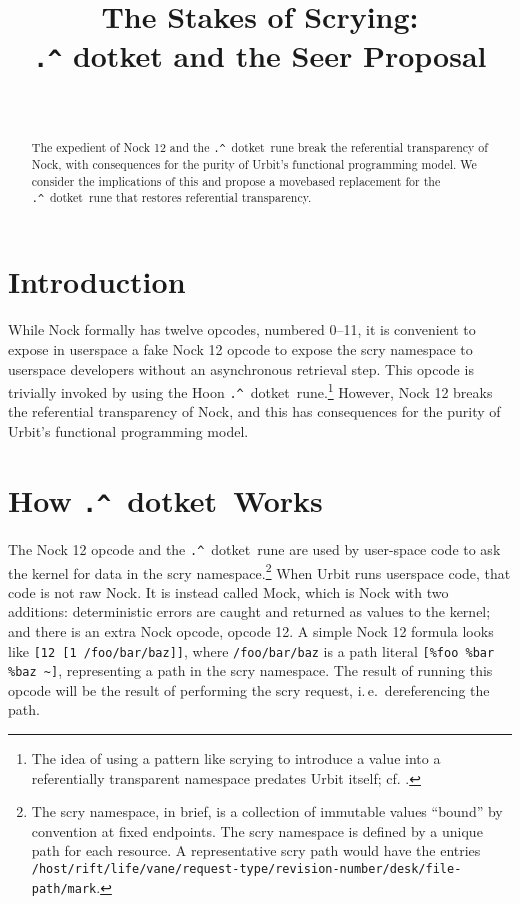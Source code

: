 \documentclass[twoside]{article}
\title{The Stakes of Scrying:  \\ \lstinline[style=inlinecode]{.^} dotket and the Seer Proposal}
\author{\authorname~\authorpatp \\ \affiliation}
\date{}
\newcommand{\dotket}{\lstinline[style=inlinecode]{.^}~dotket}
\begin{document}
\maketitle
\thispagestyle{firststyle}

\begin{abstract}
\noindent
The expedient of Nock 12 and the \dotket~rune break the referential transparency of Nock, with consequences for the purity of Urbit's functional programming model.  We consider the implications of this and propose a move\-based replacement for the \dotket~rune that restores referential transparency.
\end{abstract}

\setcounter{page}{47}

\tableofcontents

\section{Introduction}

While Nock formally has twelve opcodes, numbered 0--11, it is convenient to expose in userspace a fake Nock 12 opcode to expose the scry namespace to userspace developers without an asynchronous retrieval step.  This opcode is trivially invoked by using the Hoon \dotket~rune.\footnote{The idea of using a pattern like scrying to introduce a value into a referentially transparent namespace predates Urbit itself; cf. \citet{Yarvin2006}.}  However, Nock 12 breaks the referential transparency of Nock, and this has consequences for the purity of Urbit's functional programming model.

\section{How \dotket~Works}

The Nock 12 opcode and the \dotket~rune are used by user-\newline{}space code to ask the kernel for data in the scry namespace.\footnote{The scry namespace, in brief, is a collection of immutable values “bound” by convention at fixed endpoints.  The scry namespace is defined by a unique path for each resource.  A representative scry path would have the entries \texttt{/host/rift/life/vane/request-type/revision-number/desk\newline{}/file-path/mark}.}  When Urbit runs userspace code, that code is not raw Nock.  It is instead called Mock, which is Nock with two additions:   deterministic errors are caught and returned as values to the kernel; and there is an extra Nock opcode, opcode 12.  A simple Nock 12 formula looks like \lstinline[style=inlinecode]{[12 [1 /foo/bar/baz]]}, where \lstinline[style=inlinecode]{/foo/bar/baz} is a path literal \lstinline[style=inlinecode]{[%foo %bar %baz ~]}, representing a path in the scry namespace.  The result of running this opcode will be the result of performing the scry request, i.\,e.\ dereferencing the path.
\end{document}
